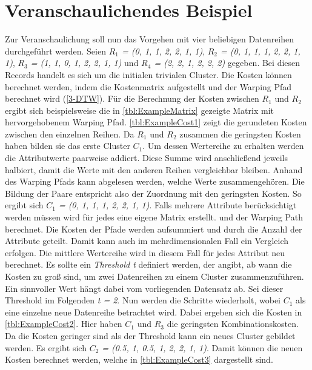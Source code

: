 \section{Veranschaulichendes Beispiel}
\label{3-Example}
Zur Veranschaulichung soll nun das Vorgehen mit vier beliebigen Datenreihen durchgeführt werden.
Seien \emph{$R_{1}$ = (0, 1, 1, 2, 2, 1, 1)}, \emph{$R_{2}$ = (0, 1, 1, 1, 2, 2, 1, 1)},
\emph{$R_{3}$ = (1, 1, 0, 1, 2, 2, 1, 1)} und \emph{$R_{4}$ = (2, 2, 1, 2, 2, 2)} gegeben.
Bei diesen Records handelt es sich um die initialen trivialen Cluster.
Die Kosten können berechnet werden, indem die Kostenmatrix aufgestellt und der Warping Pfad berechnet wird (\autoref{3-DTW}).
Für die Berechnung der Kosten zwischen \emph{$R_{1}$} und \emph{$R_{2}$} ergibt sich beispielsweise
die in \autoref{tbl:ExampleMatrix} gezeigte Matrix
mit hervorgehobenem Warping Pfad.
\autoref{tbl:ExampleCost1} zeigt die gerundeten Kosten zwischen den einzelnen Reihen.
Da \emph{$R_{1}$} und \emph{$R_{2}$} zusammen die geringsten Kosten haben bilden sie das erste Cluster \emph{$C_{1}$}.
Um dessen Wertereihe zu erhalten werden die Attributwerte paarweise addiert.
Diese Summe wird anschließend jeweils halbiert, damit die Werte mit den anderen Reihen vergleichbar bleiben.
Anhand des Warping Pfads kann abgelesen werden, welche Werte zusammengehören.
Die Bildung der Paare entspricht also der Zuordnung mit den geringsten Kosten.
So ergibt sich \emph{$C_{1}$ = (0, 1, 1, 1, 2, 2, 1, 1)}.
Falls mehrere Attribute berücksichtigt werden müssen wird für jedes eine eigene Matrix erstellt.
und der Warping Path berechnet.
Die Kosten der Pfade werden aufsummiert und durch die Anzahl der Attribute geteilt.
Damit kann auch im mehrdimensionalen Fall ein Vergleich erfolgen.
Die mittlere Wertereihe wird in diesem Fall für jedes Attribut neu berechnet.
Es sollte ein \emph{Threshold t} definiert werden,
der angibt, ab wann die Kosten zu groß sind, um zwei Datenreihen zu einem Cluster zusammenzuführen.
Ein sinnvoller Wert hängt dabei vom vorliegenden Datensatz ab.
Sei dieser Threshold im Folgenden \emph{t = 2}.
Nun werden die Schritte wiederholt, wobei \emph{$C_{1}$} als eine einzelne neue Datenreihe betrachtet wird.
Dabei ergeben sich die Kosten in \autoref{tbl:ExampleCost2}.
Hier haben \emph{$C_{1}$} und \emph{$R_{3}$} die geringsten Kombinationskosten.
Da die Kosten geringer sind als der Threshold kann ein neues Cluster gebildet werden.
Es ergibt sich \emph{$C_{2}$ = (0.5, 1, 0.5, 1, 2, 2, 1, 1)}.
Damit können die neuen Kosten berechnet werden,
welche in \autoref{tbl:ExampleCost3} dargestellt sind.
